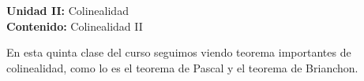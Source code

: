 {\Large
    \textbf{Unidad II:} Colinealidad\vspace{2mm}\\
    \textbf{Contenido:} Colinealidad II
}

En esta quinta clase del curso seguimos viendo teorema importantes de colinealidad, como lo es el teorema de Pascal y el teorema de Brianchon.
